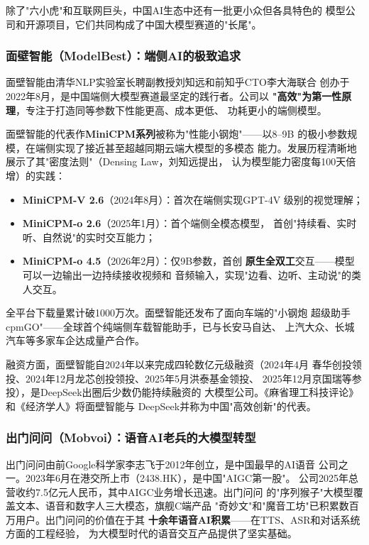 除了"六小虎"和互联网巨头，中国AI生态中还有一批更小众但各具特色的
模型公司和开源项目，它们共同构成了中国大模型赛道的"长尾"。

\subsubsection{面壁智能（ModelBest）：端侧AI的极致追求}
面壁智能由清华NLP实验室长聘副教授刘知远和前知乎CTO李大海联合
创办于2022年8月，是中国端侧大模型赛道最坚定的践行者。公司以
\textbf{"高效"为第一性原理}，专注于打造同等参数下性能更高、成本更低、
功耗更小的端侧模型。

面壁智能的代表作\textbf{MiniCPM系列}被称为"性能小钢炮"——以8--9B
的极小参数规模，在端侧实现了接近甚至超越同期云端大模型的多模态
能力。发展历程清晰地展示了其"密度法则"（Densing Law，刘知远提出，
认为模型能力密度每100天倍增）的实践：
\begin{itemize}
  \item \textbf{MiniCPM-V 2.6}（2024年8月）：首次在端侧实现GPT-4V
    级别的视觉理解；
  \item \textbf{MiniCPM-o 2.6}（2025年1月）：首个端侧全模态模型，
    首创"持续看、实时听、自然说"的实时交互能力；
  \item \textbf{MiniCPM-o 4.5}（2026年2月）：仅9B参数，首创
    \textbf{原生全双工}交互——模型可以一边输出一边持续接收视频和
    音频输入，实现"边看、边听、主动说"的类人交互。
\end{itemize}

全平台下载量累计破1000万次。面壁智能还发布了面向车端的"小钢炮
超级助手cpmGO"——全球首个纯端侧车载智能助手，已与长安马自达、
上汽大众、长城汽车等多家车企达成量产合作。

融资方面，面壁智能自2024年以来完成四轮数亿元级融资（2024年4月
春华创投领投、2024年12月龙芯创投领投、2025年5月洪泰基金领投、
2025年12月京国瑞等参投），是DeepSeek出圈后少数仍能持续融资的
大模型公司。《麻省理工科技评论》和《经济学人》将面壁智能与
DeepSeek并称为中国"高效创新"的代表。

\subsubsection{出门问问（Mobvoi）：语音AI老兵的大模型转型}
出门问问由前Google科学家李志飞于2012年创立，是中国最早的AI语音
公司之一。2023年6月在港交所上市（2438.HK），是中国"AIGC第一股"。
公司2025年总营收约7.5亿元人民币，其中AIGC业务增长迅速。出门问问
的"序列猴子"大模型覆盖文本、语音和数字人三大模态，旗舰C端产品
"奇妙文"和"魔音工坊"已积累数百万用户。出门问问的价值在于其
\textbf{十余年语音AI积累}——在TTS、ASR和对话系统方面的工程经验，
为大模型时代的语音交互产品提供了坚实基础。

